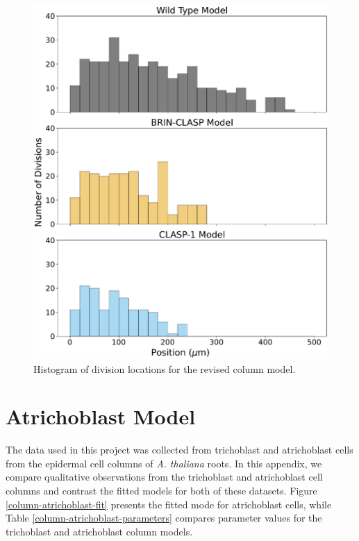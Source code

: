 \documentclass[referee,pdflatex,sn-mathphys-num]{sn-jnl}
\begin{document}
\begin{appendices}
\begin{figure}
  \centering
  \includegraphics[width=\textwidth]{column-modified-histogram.pdf}
  \caption{Histogram of division locations for the revised column model.}
\end{figure}

\section{Atrichoblast Model}\label{secA4}

The data used in this project was collected from trichoblast and atrichoblast cells from the epidermal cell columns of \emph{A. thaliana} roots. In this appendix, we compare qualitative observations from the trichoblast and atrichoblast cell columns and contrast the fitted models for both of these datasets. Figure \ref{column-atrichoblast-fit} presents the fitted mode for atrichoblast cells, while Table \ref{column-atrichoblast-parameters} compares parameter values for the trichoblast and atrichoblast column models.


\end{appendices}
\end{document}
